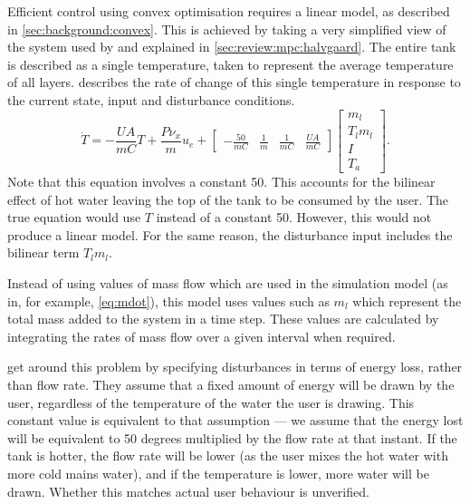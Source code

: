 Efficient control using convex optimisation requires a linear model, as described in \autoref{sec:background:convex}.
This is achieved by taking a very simplified view of the system used by  and explained in \autoref{sec:review:mpc:halvgaard}.
The entire tank is described as a single temperature, taken to represent the average temperature of all layers.
 describes the rate of change of this single temperature in response to the current state, input and disturbance conditions.
\begin{equation}
   \label{eq:tdot-halvgaard}
   \dot{T} = -\frac{UA}{mC}T + \frac{P \nu_x}{m} u_e +
      \left[ \begin{array}{cccc}
         -\frac{50}{mC} & \frac{1}{m} & \frac{1}{mC} & \frac{UA}{mC}
      \end{array} \right] \left[ \begin{array}{c}
         m_l \\ T_l m_l \\ I \\ T_a
      \end{array} \right].
\end{equation}
Note that this equation involves a constant 50.
This accounts for the bilinear effect of hot water leaving the top of the tank to be consumed by the user.
The true equation would use $T$ instead of a constant 50.
However, this would not produce a linear model.
For the same reason, the disturbance input includes the bilinear term $T_l m_l$.

Instead of using values of mass flow which are used in the simulation model (as in, for example, \autoref{eq:mdot}), this model uses values such as $m_l$ which represent the total mass added to the system in a time step.
These values are calculated by integrating the rates of mass flow over a given interval when required.

 get around this problem by specifying disturbances in terms of energy loss, rather than flow rate.
They assume that a fixed amount of energy will be drawn by the user, regardless of the temperature of the water the user is drawing.
This constant value is equivalent to that assumption --- we assume that the energy lost will be equivalent to 50 degrees multiplied by the flow rate at that instant.
If the tank is hotter, the flow rate will be lower (as the user mixes the hot water with more cold mains water), and if the temperature is lower, more water will be drawn.
Whether this matches actual user behaviour is unverified.

